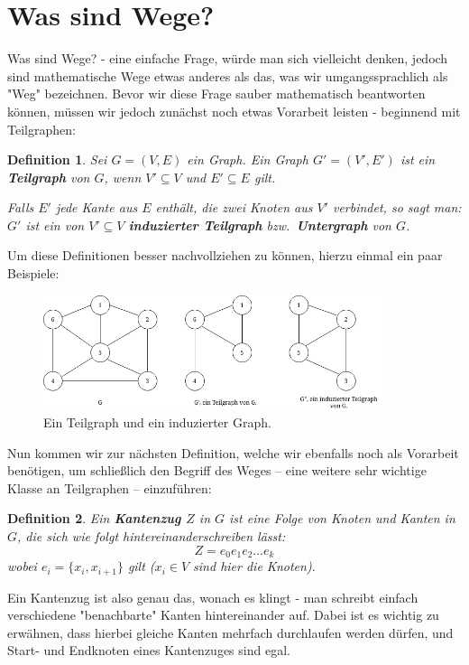 \documentclass{article}
\newtheorem{definition}{Definition}
\theoremstyle{plain}
\begin{document}
\section{Was sind Wege?}
Was sind Wege? - eine einfache Frage, würde man sich vielleicht denken, jedoch sind mathematische Wege etwas anderes als das, was wir umgangssprachlich als "Weg" bezeichnen. Bevor wir diese Frage sauber mathematisch beantworten können, müssen wir jedoch zunächst noch etwas Vorarbeit leisten - beginnend mit Teilgraphen:\\
\begin{definition}
	Sei $G = (V, E)$ ein Graph. Ein Graph $G' = (V', E')$ ist ein \textbf{Teilgraph} von $G$, wenn $V' \subseteq V$ und $E' \subseteq E$ gilt.
		\par\bigskip
	Falls $E'$ jede Kante aus $E$ enthält, die zwei Knoten aus $V'$ verbindet, so sagt man: $G'$ ist ein von $V' \subseteq V$ \textbf{induzierter Teilgraph} bzw.\ \textbf{Untergraph} von $G$.\cite[S.~8]{bue_1}
\end{definition}
Um diese Definitionen besser nachvollziehen zu können, hierzu einmal ein paar Beispiele:\\
\vfill
\begin{figure}[!htp]
    \centering
    \includegraphics[width=10cm]{vortrag_schriftlich/images/teilgraph.drawio.png}
    \caption{Ein Teilgraph und ein induzierter Graph.}
    \label{fig:fig6}
\end{figure}
\vfill
Nun kommen wir zur nächsten Definition, welche wir ebenfalls noch als Vorarbeit benötigen, um schließlich den Begriff des Weges -- eine weitere sehr wichtige Klasse an Teilgraphen -- einzuführen:\\
\begin{definition}
	Ein \textbf{Kantenzug $Z$} in $G$ ist eine Folge von Knoten und Kanten in $G$, die sich wie folgt hintereinanderschreiben lässt:
	 \begin{equation*}
		Z = e_0e_1e_2 \ldots e_k
	\end{equation*}
	 wobei $e_i = \{x_i, x_{i+1}\}$ gilt ($x_i \in V$ sind hier die Knoten).\cite[S.~9]{bue_1}
\end{definition}
\bigskip
Ein Kantenzug ist also genau das, wonach es klingt - man schreibt einfach verschiedene "benachbarte" Kanten hintereinander auf. Dabei ist es wichtig zu erwähnen, dass hierbei gleiche Kanten mehrfach durchlaufen werden dürfen, und Start- und Endknoten eines Kantenzuges sind egal.\\
\end{document}

